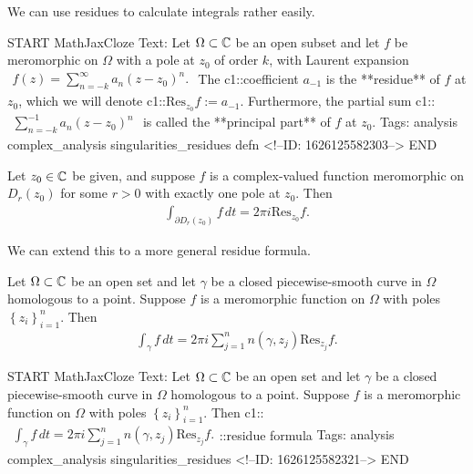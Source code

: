 \documentclass{memoir}
\begin{document}
We can use residues to calculate integrals rather easily.

\begin{anki}
START
MathJaxCloze
Text: Let \(\Omega \subset \mathbb{C}\) be an open subset and let \(f\) be meromorphic on \(\Omega \) with a pole at \(z_0\) of order \(k\), with Laurent expansion
\(\begin{align*}
  	f(z) = \sum_{n=-k}^{\infty} a_n (z-z_0)^{n}.
  \end{align*}\)
The {{c1::coefficient \(a_{-1}\)}} is the **residue** of \(f\) at \(z_0\), which we will denote {{c1::\(\textrm{Res}_{z_0}f := a_{-1}\)}}. Furthermore, the partial sum
{{c1::\(\begin{align*}
      	\sum_{n=-k}^{-1} a_n (z-z_0)^{n}
        \end{align*}\)}} 
is called the **principal part** of \(f\) at \(z_0\).
Tags: analysis complex_analysis singularities_residues defn
<!--ID: 1626125582303-->
END
\end{anki}


\begin{thm}
	Let \(z_0 \in \mathbb{C}\) be given, and suppose \(f\) is a complex-valued function meromorphic on \(D_r(z_0)\) for some \(r>0\) with exactly one pole at \(z_0\). Then
	\begin{align*}
		\int_{\partial D_r(z_0)}f \,d t = 2\pi i \textrm{Res}_{z_0}f. 
	\end{align*}
\end{thm}

We can extend this to a more general residue formula.

\begin{cor}
	Let \(\Omega \subset \mathbb{C}\) be an open set and let \(\gamma \) be a closed piecewise-smooth curve in \(\Omega \) homologous to a point. Suppose \(f\) is a meromorphic function on \(\Omega \) with poles \(\left\{ z_i \right\}_{i=1}^{n}\). Then
	\begin{align*}
		\int_{\gamma } f \,d t = 2\pi i \sum_{j=1}^{n} n(\gamma ,z_j) \textrm{Res}_{z_j}f. 
	\end{align*}
\end{cor}

\begin{anki}
START
MathJaxCloze
Text: Let \(\Omega \subset \mathbb{C}\) be an open set and let \(\gamma \) be a closed piecewise-smooth curve in \(\Omega \) homologous to a point. Suppose \(f\) is a meromorphic function on \(\Omega \) with poles \(\left\{ z_i \right\}_{i=1}^{n}\). Then
{{c1::\(\begin{align*}
        	\int_{\gamma } f \,d t = 2\pi i \sum_{j=1}^{n} n(\gamma ,z_j) \textrm{Res}_{z_j}f. 
        \end{align*}\)::residue formula}} 
Tags: analysis complex_analysis singularities_residues
<!--ID: 1626125582321-->
END
\end{anki}
\end{document}
